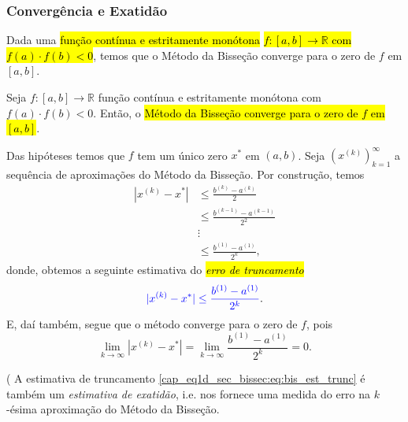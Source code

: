 \subsubsection{Convergência e Exatidão}

Dada uma \hl{função contínua e estritamente monótona} \hl{$f:[a, b]\to\mathbb{R}$ com $f(a)\cdot f(b) < 0$}, temos que o Método da Bisseção converge para o zero de $f$ em $[a, b]$.

\begin{teo}\label{cap_eq1d_sec_bissec:teo:bissece}
  Seja $f:[a, b]\to\mathbb{R}$ função contínua e estritamente monótona com $f(a)\cdot f(b) < 0$. Então, o \hl{Método da Bisseção converge para o zero de $f$ em $[a, b]$}.
\end{teo}
\begin{dem}
  Das hipóteses temos que $f$ tem um único zero $x^*$ em $(a, b)$. Seja $(x^{(k)})_{k=1}^\infty$ a sequência de aproximações do Método da Bisseção. Por construção, temos
  \begin{align}
    |x^{(k)} - x^{*}| &\leq \frac{b^{(k)}-a^{(k)}}{2}\\
                      &\leq \frac{b^{(k-1)}-a^{(k-1)}}{2^2}\\
                      &\vdots \\
                      &\leq \frac{b^{(1)}-a^{(1)}}{2^k},
  \end{align}
  donde, obtemos a seguinte estimativa do \hl{\emph{erro de truncamento}}
  \begin{equation}\label{cap_eq1d_sec_bissec:eq:bis_est_trunc}
    {\color{blue}|x^{(k)} - x^{*}| \leq \frac{b^{(1)}-a^{(1)}}{2^k}}.
  \end{equation}
  E, daí também, segue que o método converge para o zero de $f$, pois
  \begin{equation}
    \lim_{k\to\infty} |x^{(k)}-x^{*}| = \lim_{k\to\infty} \frac{b^{(1)}-a^{(1)}}{2^k} = 0.
  \end{equation}
\end{dem}

\begin{obs}(
  A estimativa de truncamento \ref{cap_eq1d_sec_bissec:eq:bis_est_trunc} é também um \emph{estimativa de exatidão}, i.e. nos fornece uma medida do erro na $k$-ésima aproximação do Método da Bisseção.
\end{obs}

